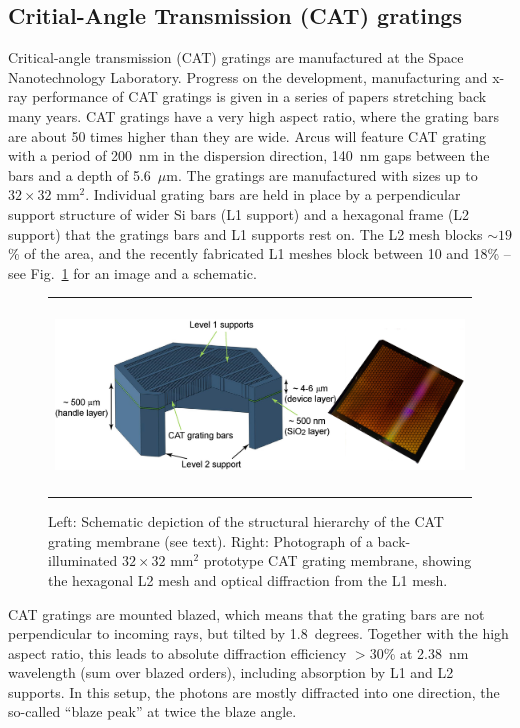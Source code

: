 \documentclass[12pt]{spieman}  %
\begin{document}
\begin{spacing}{2}
\subsection{Critial-Angle Transmission (CAT) gratings}
Critical-angle transmission (CAT) gratings are manufactured at the Space Nanotechnology Labo\-ra\-tory.
Progress on the development, manufacturing and x-ray performance of CAT gratings is given in a series of papers stretching back many years\cite{OE2008,AO2011,EIPBN2016,AO2019,2022ApJ...934..171H}.
CAT gratings have a very high aspect ratio, where the grating bars are about 50 times higher than they are wide. Arcus will feature CAT grating with a period of 200~nm in the dispersion direction, 140~nm gaps between the bars and a depth of 5.6~$\mu$m. The gratings are manufactured with sizes up to $32\times32$ mm$^2$. Individual grating bars are held in place by a perpendicular support structure of wider Si bars (L1 support) and a hexagonal frame (L2 support) that the gratings bars and L1 supports rest on. The L2 mesh blocks $\sim 19$\% of the area, and the recently fabricated L1 meshes block between 10 and 18\% -- see Fig.~\ref{fig:cell} for an image and a schematic.

\begin{figure} [ht]
    \begin{center}
    \begin{tabular}{c} %
    \includegraphics[height=5cm]{unitcell+pic.png}
    \end{tabular}
    \end{center}
    \caption {\label{fig:cell}
    Left: Schematic depiction of the structural hierarchy of the CAT grating membrane (see text). Right: Photograph of a back-illuminated $32\times32$ mm$^2$ prototype CAT grating membrane, showing the hexagonal L2 mesh and optical diffraction from the L1 mesh.
    }
\end{figure}

CAT gratings are mounted blazed, which means that the grating bars are not perpendicular to incoming rays, but tilted by 1.8~degrees. Together with the high aspect ratio, this leads to absolute diffraction efficiency $> 30$\%  at 2.38~nm wavelength (sum over blazed orders), including absorption by L1 and L2 supports\cite{doi:10.1117/12.2314180}. In this setup, the photons are mostly diffracted into one direction, the so-called ``blaze peak'' at twice the blaze angle.


\end{spacing}
\end{document}
